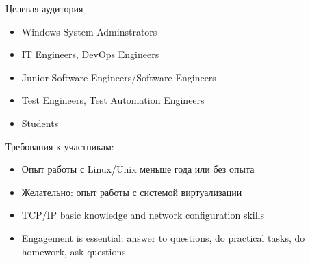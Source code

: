 \begin{frame}{Целевая аудитория}

\begin{itemize}
    \item Windows System Adminstrators
    \item IT Engineers, DevOps Engineers
    \item Junior Software Engineers/Software Engineers
    \item Test Engineers, Test Automation Engineers
    \item Students
\end{itemize}
    \pause
Требования к участникам:
\begin{itemize}
    \item Опыт работы с Linux/Unix меньше года или без опыта
    \item Желательно: опыт работы с системой виртуализации
    \item TCP/IP basic knowledge and network configuration skills
    \pause
    \item \alert{Engagement is essential: answer to questions, do practical tasks, do homework, ask questions}
\end{itemize}
\end{frame}
